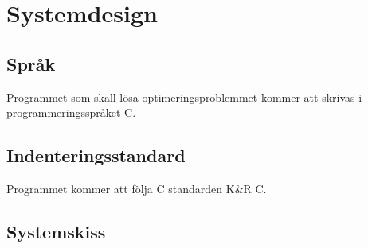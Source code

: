 \section{Systemdesign}

\subsection{Språk}
Programmet som skall lösa optimeringsproblemmet kommer att skrivas i programmeringsspråket C. 

\subsection{Indenteringsstandard}
Programmet kommer att följa C standarden K\&R C.

\subsection{Systemskiss}

